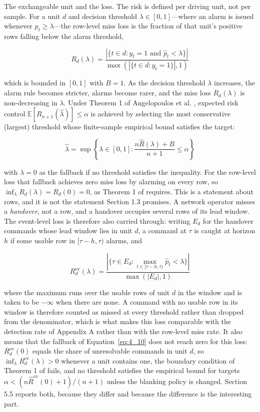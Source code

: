 The exchangeable unit and the loss. The risk is defined per driving unit, not per sample. For a unit $d$ and decision threshold $\lambda \in [0, 1]$---where an alarm is issued whenever $\hat{p}_t \ge \lambda$---the row-level miss loss is the fraction of that unit's positive rows falling below the alarm threshold,


\begin{equation}\label{eq:4_9} R_d(\lambda) = \frac{|\{ t \in d : y_t = 1 \text{ and } \hat{p}_t < \lambda \}|}{\max(|\{ t \in d : y_t = 1 \}|, 1)} \end{equation}

which is bounded in $[0, 1]$ with $B = 1$. As the decision threshold $\lambda$ increases, the alarm rule becomes stricter, alarms become rarer, and the miss loss $R_d(\lambda)$ is non-decreasing in $\lambda$. Under Theorem 1 of Angelopoulos et al. \cite{ref21}, expected risk control $\mathbb{E}[R_{n+1}(\hat{\lambda})] \le \alpha$ is achieved by selecting the most conservative (largest) threshold whose finite-sample empirical bound satisfies the target:


\begin{equation}\label{eq:4_10} \hat{\lambda} = \sup \left\{ \lambda \in [0, 1] : \frac{n \hat{R}(\lambda) + B}{n + 1} \le \alpha \right\} \end{equation}

with $\lambda = 0$ as the fallback if no threshold satisfies the inequality. For the row-level loss that fallback achieves zero miss loss by alarming on every row, so $\inf_\lambda R_d(\lambda) = R_d(0) = 0$, as Theorem 1 of \cite{ref21} requires. This is a statement about rows, and it is not the statement Section 1.3 promises. A network operator misses a \emph{handover}, not a row, and a handover occupies several rows of its lead window. The event-level loss is therefore also carried through: writing $E_d$ for the handover commands whose lead window lies in unit $d$, a command at $\tau$ is caught at horizon $h$ if some usable row in $[\tau - h, \tau)$ alarms, and


\begin{equation}\label{eq:4_11} R_d^{\text{ev}}(\lambda) = \frac{|\{ \tau \in E_d : \max_{t \in [\tau-h, \tau)} \hat{p}_t < \lambda \}|}{\max(|E_d|, 1)} \end{equation}

where the maximum runs over the usable rows of unit $d$ in the window and is taken to be $-\infty$ when there are none. A command with no usable row in its window is therefore counted as missed at every threshold rather than dropped from the denominator, which is what makes this loss comparable with the detection rate of Appendix A rather than with the row-level miss rate. It also means that the fallback of Equation~\eqref{eq:4_10} does not reach zero for this loss: $R_d^{\text{ev}}(0)$ equals the share of unresolvable commands in unit $d$, so $\inf_\lambda R_d^{\text{ev}}(\lambda) > 0$ whenever a unit contains one, the boundary condition of Theorem 1 of \cite{ref21} fails, and no threshold satisfies the empirical bound for targets $\alpha < (n\hat{R}^{\text{ev}}(0) + 1)/(n + 1)$ unless the blanking policy is changed. Section 5.5 reports both, because they differ and because the difference is the interesting part.


